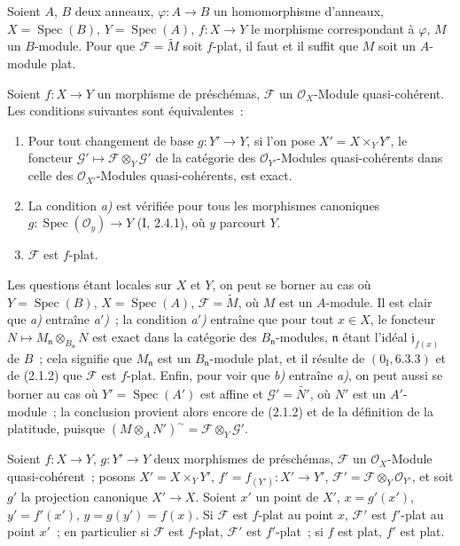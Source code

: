 \begin{proposition}[2.1.2]
\label{IV.2.1.2-fr}
Soient $A$, $B$ deux anneaux, $\varphi:A\to B$ un homomorphisme d'anneaux,
$X=\operatorname{Spec}(B)$, $Y=\operatorname{Spec}(A)$, $f:X\to Y$ le
morphisme correspondant à $\varphi$, $M$ un $B$-module. Pour que
$\mathscr F=\widetilde M$ soit $f$-plat, il faut et il suffit que $M$ soit un
$A$-module plat.
\end{proposition}

\begin{proposition}[2.1.3]
\label{IV.2.1.3-fr}
Soient $f:X\to Y$ un morphisme de préschémas, $\mathscr F$ un
$\mathcal O_X$-Module quasi-cohérent. Les conditions suivantes sont
équivalentes~:
\begin{enumerate}
\item[\emph{a)}] Pour tout changement de base $g:Y'\to Y$, si l'on pose
$X'=X\times_Y Y'$, le foncteur
$\mathscr G'\mapsto\mathscr F\otimes_Y\mathscr G'$ de la catégorie des
$\mathcal O_{Y'}$-Modules quasi-cohérents dans celle des
$\mathcal O_{X'}$-Modules quasi-cohérents, est exact.
\item[\emph{a$'$)}] La condition \emph{a)} est vérifiée pour tous les
morphismes canoniques $g:\operatorname{Spec}(\mathcal O_y)\to Y$ (I, 2.4.1),
où $y$ parcourt $Y$.
\item[\emph{b)}] $\mathscr F$ est $f$-plat.
\end{enumerate}
\end{proposition}

Les questions étant locales sur $X$ et $Y$, on peut se borner au cas où
$Y=\operatorname{Spec}(B)$, $X=\operatorname{Spec}(A)$,
$\mathscr F=\widetilde M$, où $M$ est un $A$-module. Il est clair que
\emph{a)} entraîne \emph{a$'$)}~; la condition \emph{a$'$)} entraîne que
pour tout $x\in X$, le foncteur $N\mapsto M_{\mathfrak n}\otimes_{B_{\mathfrak n}}N$
est exact dans la catégorie des $B_{\mathfrak n}$-modules, $\mathfrak n$
étant l'idéal $\mathfrak j_{f(x)}$ de $B$~; cela signifie que
$M_{\mathfrak n}$ est un $B_{\mathfrak n}$-module plat, et il résulte de
$(0_{\mathrm I},6.3.3)$ et de (2.1.2) que $\mathscr F$ est $f$-plat. Enfin,
pour voir que \emph{b)} entraîne \emph{a)}, on peut aussi se borner au cas où
$Y'=\operatorname{Spec}(A')$ est affine et $\mathscr G'=\widetilde{N'}$, où
$N'$ est un $A'$-module~; la conclusion provient alors encore de (2.1.2) et
de la définition de la platitude, puisque
$(M\otimes_A N')^{\sim}=\mathscr F\otimes_Y\mathscr G'$.

\begin{proposition}[2.1.4]
\label{IV.2.1.4-fr}
Soient $f:X\to Y$, $g:Y'\to Y$ deux morphismes de préschémas, $\mathscr F$
un $\mathcal O_X$-Module quasi-cohérent~; posons $X'=X\times_Y Y'$,
$f'=f_{(Y')}:X'\to Y'$, $\mathscr F'=\mathscr F\otimes_Y\mathcal O_{Y'}$,
et soit $g'$ la projection canonique $X'\to X$. Soient $x'$ un point de
$X'$, $x=g'(x')$, $y'=f'(x')$, $y=g(y')=f(x)$. Si $\mathscr F$ est $f$-plat
au point $x$, $\mathscr F'$ est $f'$-plat au point $x'$~; en particulier si
$\mathscr F$ est $f$-plat, $\mathscr F'$ est $f'$-plat~; si $f$ est plat,
$f'$ est plat.
\end{proposition}

